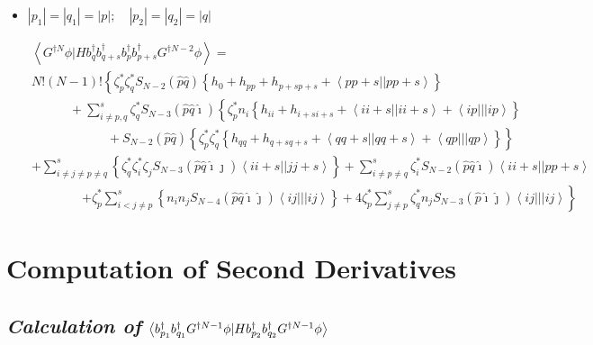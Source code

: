 \begin{itemize}
\item $\left| p_{1}\right| =\left| q_{1}\right| =\left| p\right| ;\quad
\left| p_{2}\right| =\left| q_{2}\right| =\left| q\right| $
\end{itemize}

\begin{eqnarray}
&&\left\langle G^{\dagger N}\phi |Hb_{q}^{\dagger }b_{q+s}^{\dagger
}b_{p}^{\dagger }b_{p+s}^{\dagger }G^{\dagger N-2}\phi \right\rangle = 
\nonumber \\
&&N!\left( N-1\right) !\left\{ \zeta _{p}^{\ast }\zeta _{q}^{\ast
}S_{N-2}\left( \hat{p}\hat{q}\right) \left\{
h_{0}+h_{pp}+h_{p+sp+s}+\left\langle pp+s||pp+s\right\rangle \right\} \right.
\nonumber \\
&&\left. {}\right. \qquad \quad +\sum_{i\neq p,q}^{s}\zeta _{q}^{\ast
}S_{N-3}\left( \hat{p}\hat{q}\hat{\imath}\right) \left\{ \zeta _{p}^{\ast
}n_{i}\left\{ h_{ii}+h_{i+si+s}+\left\langle ii+s||ii+s\right\rangle
+\left\langle ip|||ip\right\rangle \right\} \right.  \nonumber \\
&&\qquad \qquad \qquad +S_{N-2}\left( \hat{p}\hat{q}\right) \left\{ \zeta
_{p}^{\ast }\zeta _{q}^{\ast }\left\{ h_{qq}+h_{q+sq+s}+\left\langle
qq+s||qq+s\right\rangle +\left\langle qp|||qp\right\rangle \right\} \right\}
\nonumber \\
&&+\sum_{i\neq j\neq p\neq q}^{s}\left\{ \zeta _{q}^{\ast }\zeta _{i}^{\ast
}\zeta _{j}S_{N-3}\left( \hat{p}\hat{q}\hat{\imath}\hat{\jmath}\right)
\left\langle ii+s||jj+s\right\rangle \right\} +\sum_{i\neq p\neq q}^{s}\zeta
_{i}^{\ast }S_{N-2}\left( \hat{p}\hat{q}\hat{\imath}\right) \left\langle
ii+s||pp+s\right\rangle  \nonumber \\
&&\qquad \qquad \left. +\zeta _{p}^{\ast }\sum_{i<j\neq p}^{s}\left\{
n_{i}n_{j}S_{N-4}\left( \hat{p}\hat{q}\hat{\imath}\hat{\jmath}\right)
\left\langle ij|||ij\right\rangle \right\} +4\zeta _{p}^{\ast }\sum_{j\neq
p}^{s}\zeta _{q}^{\ast }n_{j}S_{N-3}\left( \hat{p}\hat{\imath}\hat{\jmath}%
\right) \left\langle ij|||ij\right\rangle \right\}
\end{eqnarray}

\appendix

\section{Computation of Second Derivatives}

\subsection{{\it Calculation of} $\left\langle b_{p_{1}}^{\dagger
}b_{q_{1}}^{\dagger }G^{\dagger N-1}\protect\phi |Hb_{p_{2}}^{\dagger
}b_{q_{2}}^{\dagger }G^{\dagger N-1}\protect\phi \right\rangle $}


